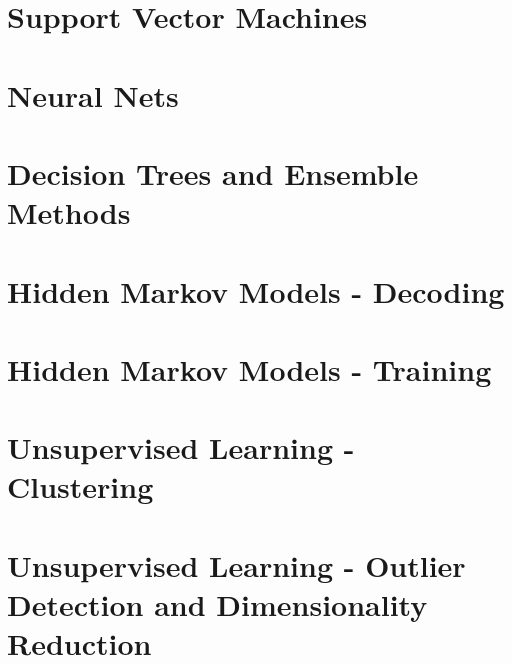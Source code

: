 \documentclass[oneside]{memoir}
\begin{document}
\section{Support Vector Machines}
\section{Neural Nets}
\section{Decision Trees and Ensemble Methods}
\section{Hidden Markov Models - Decoding}
\section{Hidden Markov Models - Training}
\section{Unsupervised Learning - Clustering}
\section{Unsupervised Learning - Outlier Detection and Dimensionality Reduction}
\end{document}
